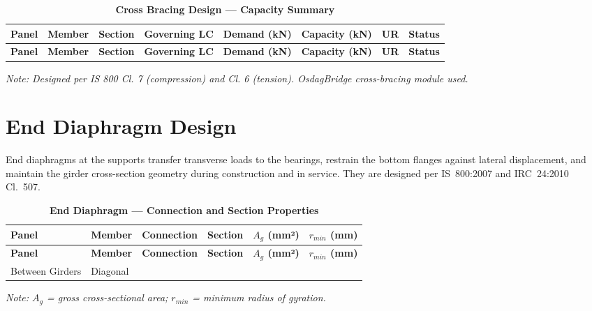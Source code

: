 \documentclass[12pt,a4paper]{report}
\numberwithin{table}{chapter}
\numberwithin{figure}{chapter}
\newcommand{\reportrowpad}{4pt}
\newcommand{\reportsectiongap}{0.75em}
\newcommand{\reportsmallgap}{0.4em}
\newcommand{\reporttabcolsep}{3pt}
\begin{document}
\vspace{\reportsectiongap}
\begin{longtable}{|C{2.0cm}|L{1.8cm}|C{2.2cm}|C{3.0cm}|C{1.8cm}|C{1.8cm}|C{1.2cm}|C{1.8cm}|}
\caption{\textbf{Cross Bracing Design --- Capacity Summary}}\\
\hline
\textbf{Panel} & \textbf{Member} & \textbf{Section} & \textbf{Governing LC} & \textbf{Demand (kN)} & \textbf{Capacity (kN)} & \textbf{UR} & \textbf{Status} \\[\reportrowpad]
\hline
\endfirsthead
\hline
\textbf{Panel} & \textbf{Member} & \textbf{Section} & \textbf{Governing LC} & \textbf{Demand (kN)} & \textbf{Capacity (kN)} & \textbf{UR} & \textbf{Status} \\[\reportrowpad]
\hline
\endhead

\end{longtable}
\noindent\textit{Note: Designed per IS 800 Cl. 7 (compression) and Cl. 6 (tension). OsdagBridge cross-bracing module used.}

\section{End Diaphragm Design}
\label{sec:end-diaphragm}

End diaphragms at the supports transfer transverse loads to the bearings, restrain the bottom flanges against lateral displacement, and maintain the girder cross-section geometry during construction and in service. They are designed per IS~800:2007 and IRC~24:2010 Cl.~507.

\vspace{\reportsectiongap}

\vspace{\reportsmallgap}
\noindent
\setlength{\tabcolsep}{\reporttabcolsep}
\setlength{\LTleft}{0pt}
\setlength{\LTright}{\fill}

\begin{longtable}{|C{2.0cm}|L{2.0cm}|L{2.2cm}|C{2.5cm}|C{2.0cm}|C{2.0cm}|}
\caption{\textbf{End Diaphragm --- Connection and Section Properties}}\\
\hline
\textbf{Panel} & \textbf{Member} & \textbf{Connection} & \textbf{Section} & \textbf{$A_g$ (mm²)} & \textbf{$r_{min}$ (mm)} \\[\reportrowpad]
\hline
\endfirsthead
\hline
\textbf{Panel} & \textbf{Member} & \textbf{Connection} & \textbf{Section} & \textbf{$A_g$ (mm²)} & \textbf{$r_{min}$ (mm)} \\[\reportrowpad]
\hline
\endhead
Between Girders & Diagonal &  &  &  &  \\[\reportrowpad]
\hline
\end{longtable}
\noindent\textit{Note: $A_g$ = gross cross-sectional area; $r_{min}$ = minimum radius of gyration.}
\end{document}
